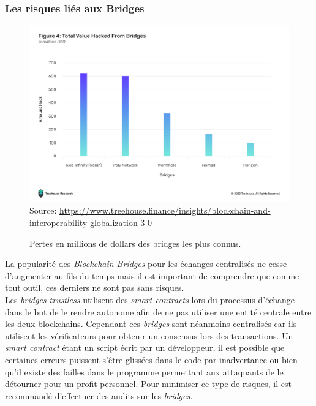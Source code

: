 \subsubsection{Les risques liés aux Bridges}

\begin{figure}[h!]
    \centering

\includegraphics[scale=0.30]{centralisation/imagesBridges/GraphLossesBridges.png}
    {\scriptsize
            Source: \url{https://www.treehouse.finance/insights/blockchain-and-interoperability-globalization-3-0}}
    \caption{Pertes en millions de dollars des bridges les plus connus.}
    \label{fig:GraphBridges}
\end{figure}

La popularité des \textit{Blockchain Bridges} pour les échanges centralisés ne cesse d’augmenter au fils du temps mais il est important de comprendre que comme tout outil, ces derniers ne sont pas sans risques. \\

Les \textit{bridges trustless} utilisent des \textit{smart contracts} lors du processus d’échange dans le but de le rendre autonome afin de ne pas utiliser une entité centrale entre les deux blockchains. Cependant ces \textit{bridges} sont néanmoins centralisés car ils utilisent les vérificateurs pour obtenir un consensus lors des transactions.
Un \textit{smart contract} étant un script écrit par un développeur, il est possible que certaines erreurs puissent s’être glissées dans le code par inadvertance ou bien qu’il existe des failles dans le programme permettant aux attaquants de le détourner pour un profit personnel. 
Pour minimiser ce type de risques, il est recommandé d’effectuer des audits sur les \textit{bridges.} \\

